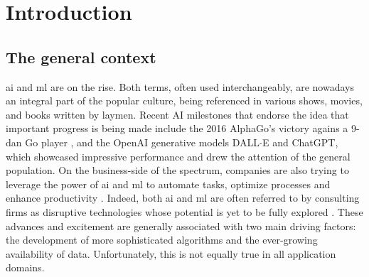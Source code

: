 \cleardoublepage
\chapter{Introduction}

\section{The general context}

\Ac{ai} and \ac{ml} are on the rise. Both terms, often used interchangeably, are nowadays an integral part of the popular culture, being referenced in various shows, movies, and books written by laymen. Recent AI milestones that endorse the idea that important progress is being made include the 2016 AlphaGo's victory agains a 9-dan Go player \citep{silver2016mastering}, and the OpenAI generative models DALL$\cdot$E and ChatGPT, which showcased impressive performance and drew the attention of the general population. On the business-side of the spectrum, companies are also trying to leverage the power of \ac{ai} and \ac{ml} to automate tasks, optimize processes and enhance productivity \citep{Chui2022}. Indeed, both \ac{ai} and \ac{ml} are often referred to by consulting firms as disruptive technologies whose potential is yet to be fully explored \citep{Bechtel2022}. These advances and excitement are generally associated with two main driving factors: the development of more sophisticated algorithms and the ever-growing availability of data. Unfortunately, this is not equally true in all application domains.

